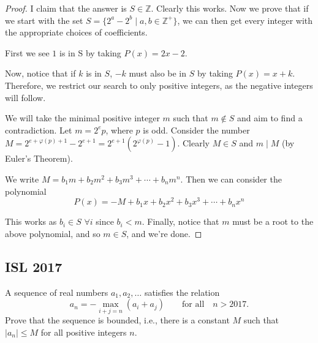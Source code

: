 \documentclass{article}
\theoremstyle{mytheoremstyle}
\theoremstyle{mytheoremstyle}
\theoremstyle{myproblemstyle}
\begin{document}
    \begin{proof}
        I claim that the answer is $S \in \mathbb{Z}$. Clearly this works. Now we prove that if we start with the set $S = \{2^a - 2^b \mid a, b \in \mathbb{Z}^+\}$, we can then get every integer with the appropriate choices of coefficients. 
        
        First we see $1$ is in S by taking $P(x) = 2x - 2$.

        Now, notice that if $k$ is in $S$, $-k$ must also be in $S$ by taking $P(x) = x + k$. Therefore, we restrict our search to only positive integers, as the negative integers will follow.

        We will take the minimal positive integer $m$ such that $m \notin S$ and aim to find a contradiction. Let $m = 2^ep$, where $p$ is odd. Consider the number $M = 2^{e + \varphi(p) + 1} - 2^{e+1} = 2^{e+1}(2^{\varphi(p)} - 1)$. Clearly $M \in S$ and $m \mid M$ (by Euler's Theorem).
        
        We write $M = b_1m + b_2m^2 + b_3m^3 + \cdots + b_nm^n$. Then we can consider the polynomial \[P(x) = -M + b_1x + b_2x^2 + b_3x^3 + \cdots + b_nx^n\]

        This works as $b_i \in S$ $\forall i$ since $b_i < m$. Finally, notice that $m$ must be a root to the above polynomial, and so $m \in S$, and we're done.
    \end{proof}

    
    \subsection{ISL 2017}
    \begin{problem}[2017 A4]
        A sequence of real numbers $a_1,a_2,\ldots$ satisfies the relation
\[ a_n=-\max_{i+j=n}(a_i+a_j)\qquad\text{for all}\quad n>2017. \]
Prove that the sequence is bounded, i.e., there is a constant $M$ such that $|a_n|\leq M$ for all positive integers $n$.
    \end{problem}
\end{document}
